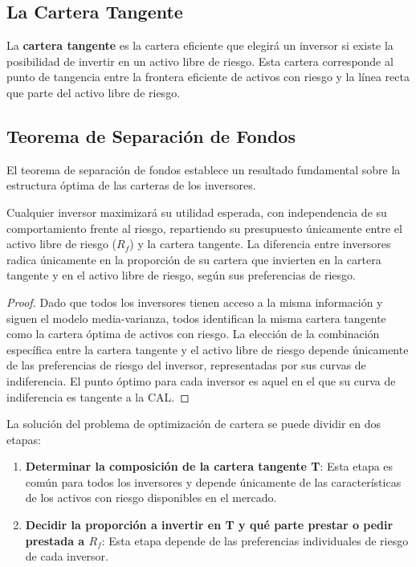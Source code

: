 \subsection{La Cartera Tangente}

\begin{definicion}
La \textbf{cartera tangente} es la cartera eficiente que elegirá un inversor si existe la posibilidad de invertir en un activo libre de riesgo. Esta cartera corresponde al punto de tangencia entre la frontera eficiente de activos con riesgo y la línea recta que parte del activo libre de riesgo.
\end{definicion}

\subsection{Teorema de Separación de Fondos}

El teorema de separación de fondos establece un resultado fundamental sobre la estructura óptima de las carteras de los inversores.

\begin{teorema}
Cualquier inversor maximizará su utilidad esperada, con independencia de su comportamiento frente al riesgo, repartiendo su presupuesto únicamente entre el activo libre de riesgo ($R_f$) y la cartera tangente. La diferencia entre inversores radica únicamente en la proporción de su cartera que invierten en la cartera tangente y en el activo libre de riesgo, según sus preferencias de riesgo.
\end{teorema}

\begin{proof}
Dado que todos los inversores tienen acceso a la misma información y siguen el modelo media-varianza, todos identifican la misma cartera tangente como la cartera óptima de activos con riesgo. La elección de la combinación específica entre la cartera tangente y el activo libre de riesgo depende únicamente de las preferencias de riesgo del inversor, representadas por sus curvas de indiferencia. El punto óptimo para cada inversor es aquel en el que su curva de indiferencia es tangente a la CAL.
\end{proof}

La solución del problema de optimización de cartera se puede dividir en dos etapas:

\begin{enumerate}
\item \textbf{Determinar la composición de la cartera tangente T}: Esta etapa es común para todos los inversores y depende únicamente de las características de los activos con riesgo disponibles en el mercado.
\item \textbf{Decidir la proporción a invertir en T y qué parte prestar o pedir prestada a $R_f$}: Esta etapa depende de las preferencias individuales de riesgo de cada inversor.
\end{enumerate}

